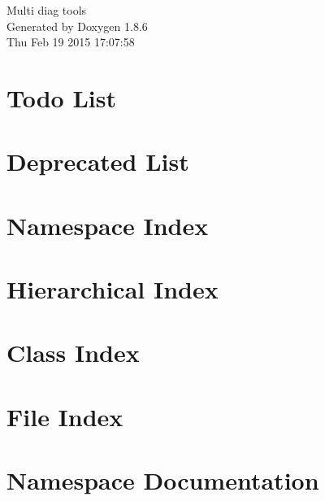 \documentclass[twoside]{book}
\newcommand{\clearemptydoublepage}{%
  \newpage{\pagestyle{empty}\cleardoublepage}%
}
\begin{document}
\hypersetup{pageanchor=false}
\begin{titlepage}
\vspace*{7cm}
\begin{center}%
{\Large Multi diag tools }\\
\vspace*{1cm}
{\large Generated by Doxygen 1.8.6}\\
\vspace*{0.5cm}
{\small Thu Feb 19 2015 17:07:58}\\
\end{center}
\end{titlepage}
\clearemptydoublepage
\tableofcontents
\clearemptydoublepage
{}
\hypersetup{pageanchor=true}

\chapter{Todo List}
\label{todo}
\hypertarget{todo}{}

\chapter{Deprecated List}
\label{deprecated}
\hypertarget{deprecated}{}

\chapter{Namespace Index}

\chapter{Hierarchical Index}

\chapter{Class Index}

\chapter{File Index}

\chapter{Namespace Documentation}






\end{document}
